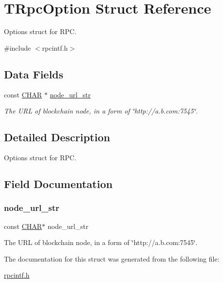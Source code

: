 \hypertarget{struct_t_rpc_option}{}\section{T\+Rpc\+Option Struct Reference}
\label{struct_t_rpc_option}


Options struct for R\+PC.  




{\ttfamily \#include $<$rpcintf.\+h$>$}

\subsection*{Data Fields}
\begin{DoxyCompactItemize}
\item 
const \mbox{\hyperlink{boattypes_8h_aebb9e13210d88d43e32e735ada43a425}{C\+H\+AR}} $\ast$ \mbox{\hyperlink{struct_t_rpc_option_a2e685a3c04ad4fb456a9e460ae92bc0e}{node\+\_\+url\+\_\+str}}
\begin{DoxyCompactList}\small\item\em The U\+RL of blockchain node, in a form of \char`\"{}http\+://a.\+b.\+com\+:7545\char`\"{}. \end{DoxyCompactList}\end{DoxyCompactItemize}


\subsection{Detailed Description}
Options struct for R\+PC. 

\subsection{Field Documentation}
\mbox{\label{struct_t_rpc_option_a2e685a3c04ad4fb456a9e460ae92bc0e}} 
\subsubsection{\texorpdfstring{node\+\_\+url\+\_\+str}{node\_url\_str}}
{\footnotesize\ttfamily const \mbox{\hyperlink{boattypes_8h_aebb9e13210d88d43e32e735ada43a425}{C\+H\+AR}}$\ast$ node\+\_\+url\+\_\+str}



The U\+RL of blockchain node, in a form of \char`\"{}http\+://a.\+b.\+com\+:7545\char`\"{}. 



The documentation for this struct was generated from the following file\+:\begin{DoxyCompactItemize}
\item 
\mbox{\hyperlink{rpcintf_8h}{rpcintf.\+h}}\end{DoxyCompactItemize}

